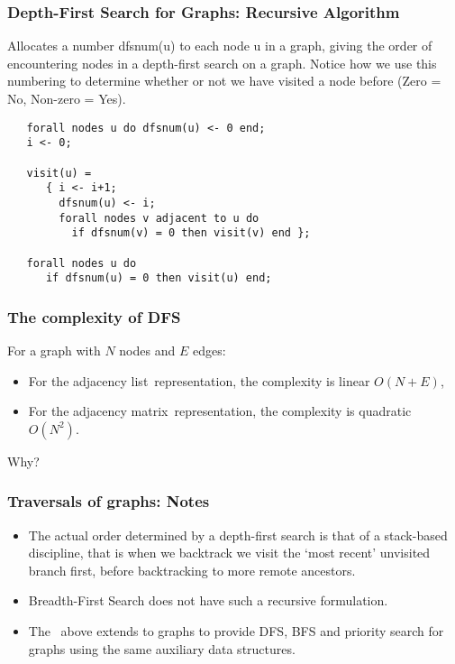   \begin{frame}[fragile]
  \frametitle{Depth-First Search for Graphs: Recursive Algorithm}

Allocates a number \color{blue}dfsnum(u) \color{black} to each node u in a graph, giving the order of 
encountering nodes in a depth-first search on a graph. Notice how we use this numbering to 
determine whether or not we have visited a node before (Zero = No, Non-zero = Yes).

\begin{verbatim}
   forall nodes u do dfsnum(u) <- 0 end;
   i <- 0;

   visit(u) =
      { i <- i+1;
        dfsnum(u) <- i;
        forall nodes v adjacent to u do
          if dfsnum(v) = 0 then visit(v) end };

   forall nodes u do
      if dfsnum(u) = 0 then visit(u) end;
\end{verbatim}
\end{frame}

  \begin{frame}[fragile]\frametitle{The complexity of DFS}

For a graph with $N$ nodes and $E$ edges:
\begin{itemize}
\item For the \color{blue}adjacency list\color{black}\ representation, the complexity is linear $O(N+E)$,
\item For the \color{blue}adjacency matrix\color{black}\ representation, the complexity is quadratic $O(N^2)$.
\end {itemize}

\alert{Why?}
\end{frame}

  \begin{frame}[fragile]
\frametitle{Traversals of graphs: Notes}

\begin{itemize}
\item The actual order determined by a depth-first search is that of a \color{blue}stack-based discipline\color{black},
that is when we backtrack we visit the `most recent' unvisited branch first, 
before backtracking to more remote ancestors.

\item Breadth-First Search does not have such a recursive formulation. 

\item The \color{blue}{generic code for trees}\ above extends to graphs to provide DFS, BFS and priority search for graphs using the same auxiliary data structures.
\end{itemize}
\end{frame}

